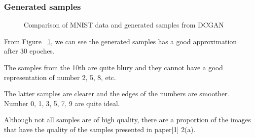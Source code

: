 \documentclass{article}
\begin{document}
\subsubsection{Generated samples}

\begin{figure}[!htb]
  \centering
  \caption{Comparison of MNIST data and generated samples from DCGAN}
  \label{fig:DCGAN_MNIST}
\end{figure}

From Figure ~\ref{fig:DCGAN_MNIST}, 
we can see the generated samples has a good approximation after 30 epoches.

The samples from the 10th are quite blury and they cannot have a good representation of number 2, 5, 8, etc.

The latter samples are clearer and the edges of the numbers are smoother. Number 0, 1, 3, 5, 7, 9 are quite ideal.

Although not all samples are of high quality, there are a proportion of the images that have the quality of the samples presented in paper[1] 2(a).
\end{document}
